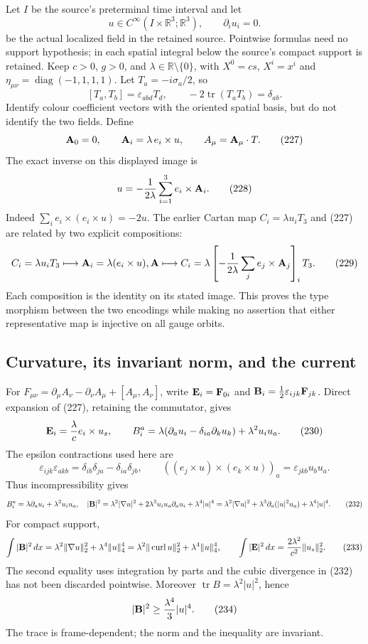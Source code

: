 \documentclass[11pt]{article}
\begin{document}
Let \(I\) be the source's preterminal time interval and let
\[
 u\in C^\infty(I\times\mathbb R^3;\mathbb R^3),\qquad
 \partial_i u_i=0.
\tag{225}
\]
be the actual localized field in the retained source. Pointwise formulas
need no support hypothesis; in each spatial integral below the source's
compact support is retained. Keep \(c>0\), \(g>0\), and
\(\lambda\in\mathbb R\setminus\{0\}\), with \(X^0=cs\), \(X^i=x^i\) and
\(\eta_{\mu\nu}=\operatorname{diag}(-1,1,1,1)\). Let
\(T_a=-i\sigma_a/2\), so
\[
 [T_a,T_b]=\varepsilon_{abd}T_d,\qquad
 -2\operatorname{tr}(T_aT_b)=\delta_{ab}.
\tag{226}
\]
Identify colour coefficient vectors with the oriented spatial basis, but
do not identify the two fields. Define
\[
 {\bf A}_0=0,\qquad {\bf A}_i=\lambda\,e_i\times u,\qquad
 A_\mu={\bf A}_\mu\cdot T.
\tag{227}
\]
The exact inverse on this displayed image is
\[
 u=-\frac1{2\lambda}\sum_{i=1}^3e_i\times{\bf A}_i.
\tag{228}
\]
Indeed \(\sum_i e_i\times(e_i\times u)=-2u\). The earlier Cartan map
\(C_i=\lambda u_iT_3\) and (227) are related by two explicit compositions:
\[
 C_i=\lambda u_iT_3\longmapsto {\bf A}_i=\lambda(e_i\times u),
 {\bf A}\longmapsto
 C_i=\lambda\left[-\frac1{2\lambda}\sum_j e_j\times{\bf A}_j\right]_iT_3.
\tag{229}
\]
Each composition is the identity on its stated image. This proves the
type morphism between the two encodings while making no assertion that
either representative map is injective on all gauge orbits.

\subsection{Curvature, its invariant norm, and the current}

For \(F_{\mu\nu}=\partial_\mu A_\nu-\partial_\nu A_\mu+[A_\mu,A_\nu]\),
write \({\bf E}_i={\bf F}_{0i}\) and
\({\bf B}_i=\frac12\varepsilon_{ijk}{\bf F}_{jk}\). Direct expansion of
(227), retaining the commutator, gives
\[
 {\bf E}_i=\frac{\lambda}{c}e_i\times u_s,\qquad
 B_i^a=\lambda(\partial_a u_i-\delta_{ia}\partial_k u_k)
               +\lambda^2u_i u_a.
\tag{230}
\]
The epsilon contractions used here are
\[
 \varepsilon_{ijk}\varepsilon_{akb}
 =\delta_{ib}\delta_{ja}-\delta_{ia}\delta_{jb},\qquad
 ((e_j\times u)\times(e_k\times u))_a
 =\varepsilon_{jkb}u_bu_a.
\tag{231}
\]
Thus incompressibility gives
\[
 B_i^a=\lambda\partial_a u_i+\lambda^2u_i u_a,\quad
 |{\bf B}|^2=\lambda^2|\nabla u|^2+
 2\lambda^3u_i u_a\partial_a u_i+\lambda^4|u|^4
 =\lambda^2|\nabla u|^2+\lambda^3\partial_a(|u|^2u_a)
 +\lambda^4|u|^4.
\tag{232}
\]
For compact support,
\[
 \int|{\bf B}|^2\,dx
 =\lambda^2\|\nabla u\|_2^2+\lambda^4\|u\|_4^4
 =\lambda^2\|\operatorname{curl}u\|_2^2+\lambda^4\|u\|_4^4,\qquad
 \int|{\bf E}|^2\,dx=\frac{2\lambda^2}{c^2}\|u_s\|_2^2.
\tag{233}
\]
The second equality uses integration by parts and the cubic divergence in
(232) has not been discarded pointwise. Moreover
\(\operatorname{tr}B=\lambda^2|u|^2\), hence
\[
 |{\bf B}|^2\ge\frac{\lambda^4}{3}|u|^4.
\tag{234}
\]
The trace is frame-dependent; the norm and the inequality are invariant.
\end{document}
